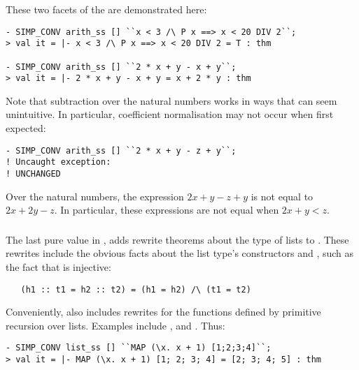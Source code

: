 {These two facets of the  \simpset{} are demonstrated
here:
\begin{session}
\begin{hol}
\begin{verbatim}
- SIMP_CONV arith_ss [] ``x < 3 /\ P x ==> x < 20 DIV 2``;
> val it = |- x < 3 /\ P x ==> x < 20 DIV 2 = T : thm

- SIMP_CONV arith_ss [] ``2 * x + y - x + y``;
> val it = |- 2 * x + y - x + y = x + 2 * y : thm
\end{verbatim}
\end{hol}
\end{session}
Note that subtraction over the natural numbers works in ways that can
seem unintuitive.  In particular, coefficient normalisation may not
occur when first expected:
\begin{session}
\begin{hol}
\begin{verbatim}
- SIMP_CONV arith_ss [] ``2 * x + y - z + y``;
! Uncaught exception:
! UNCHANGED
\end{verbatim}
\end{hol}
\end{session}
Over the natural numbers, the expression $2 x + y - z + y$ is not
equal to $2 x + 2 y - z$.  In particular, these expressions are not
equal when $2x + y < z$.

\subsubsection{}
%
%
The last pure \simpset{} value in ,  adds
rewrite theorems about the type of lists to .  These
rewrites include the obvious facts about the list type's constructors
 and , such as the fact that  is
injective:
\begin{hol}
\begin{verbatim}
   (h1 :: t1 = h2 :: t2) = (h1 = h2) /\ (t1 = t2)
\end{verbatim}
\end{hol}
Conveniently,  also includes rewrites for the functions
defined by primitive recursion over lists.  Examples include
,  and .  Thus:
\begin{session}
\begin{hol}
\begin{verbatim}
- SIMP_CONV list_ss [] ``MAP (\x. x + 1) [1;2;3;4]``;
> val it = |- MAP (\x. x + 1) [1; 2; 3; 4] = [2; 3; 4; 5] : thm


\end{verbatim}
\end{hol}
\end{session}}
